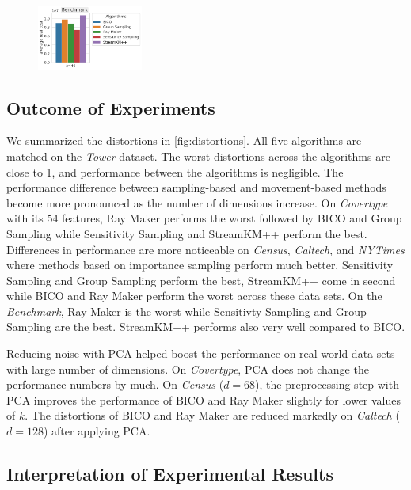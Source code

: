 \begin{figure}
{    \includegraphics[width=0.31\textwidth]{figures/real-costs-Benchmark-k40.pdf}
  }
\end{figure}





\subsection{Outcome of Experiments}
We summarized the distortions in \cref{fig:distortions}.
All five algorithms are matched on the \textit{Tower} dataset. The worst distortions across the algorithms are close to 1, and performance between the algorithms is negligible. The performance difference between sampling-based and movement-based methods become more pronounced as the number of dimensions increase. On \textit{Covertype} with its 54 features, Ray Maker performs the worst followed by BICO and Group Sampling while Sensitivity Sampling and StreamKM++ perform the best. Differences in performance are more noticeable on \textit{Census}, \textit{Caltech}, and \textit{NYTimes}  where methods based on importance sampling perform much better. Sensitivity Sampling and Group Sampling perform the best, StreamKM++ come in second while BICO and Ray Maker perform the worst across these data sets.
On the \textit{Benchmark}, Ray Maker is the worst while Sensitivty Sampling and Group Sampling are the best. StreamKM++ performs also very well compared to BICO.

Reducing noise with PCA helped boost the performance on real-world data sets with large number of dimensions. On \textit{Covertype}, PCA does not change the performance numbers by much. On \textit{Census} ($d=68$), the preprocessing step with PCA improves the performance of BICO and Ray Maker slightly for lower values of $k$. The distortions of BICO and Ray Maker are reduced markedly on \textit{Caltech} ($d=128$) after applying PCA. 


\subsection{Interpretation of Experimental Results}



